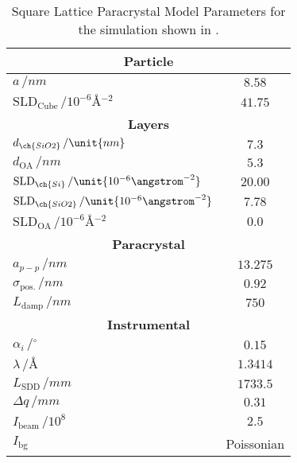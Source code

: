 \documentclass[\main/dresen_thesis.tex]{subfiles}
\begin{document}
  \begin{table}[ht]
    \centering
    \caption{\label{tab:monolayers:structure:squareArrayParacrystal:BornAgainSimulation}Square Lattice Paracrystal Model Parameters for the simulation shown in .}
    \begin{tabular}{l | c}
      \hline
      \multicolumn{2}{c}{\textbf{Particle}}\\
      \hline
      $a \, / \unit{nm}$ &
        $8.58$ \\
      $\mathrm{SLD}_\mathrm{Cube} \, / \unit{10^{-6} \angstrom^{-2}}$ &
        $41.75$ \\
      \hline
      \multicolumn{2}{c}{\textbf{Layers}}\\
      \hline
      $d_{\ch{SiO2}}\, / \unit{nm}$ &
        $7.3$\\
      $d_{\mathrm{OA}}\, / \unit{nm}$ &
        $5.3$\\
      $\mathrm{SLD}_{\ch{Si}} \, / \unit{10^{-6} \angstrom^{-2}}$ &
        $20.00$\\
      $\mathrm{SLD}_{\ch{SiO2}} \, / \unit{10^{-6} \angstrom^{-2}}$ &
        $7.78$\\
      $\mathrm{SLD}_\mathrm{OA} \, / \unit{10^{-6} \angstrom^{-2}}$ &
        $0.0$ \\
      \hline
      \multicolumn{2}{c}{\textbf{Paracrystal}}\\
      \hline
      $a_{p-p} \, / \unit{nm}$ &
        $13.275$ \\
      $\sigma_\mathrm{pos.}\, / \unit{nm}$ &
        $0.92$ \\
      $L_\mathrm{damp} \, / \unit{nm}$ &
        $750$ \\
      \hline
      \multicolumn{2}{c}{\textbf{Instrumental}}\\
      \hline
      $\alpha_i \, / \unit{^\circ}$ &
        $0.15$ \\
      $\lambda \, / \unit{\angstrom}$ &
        $1.3414$ \\
      $L_\mathrm{SDD} \, / \unit{mm}$ &
        $1733.5$ \\
      $\Delta q \, /\unit{mm}$ &
        $0.31$ \\
      $I_\mathrm{beam} \, / \unit{10^8}$ &
        $2.5$ \\
      $I_\mathrm{bg}$ &
        Poissonian \\
      \hline
    \end{tabular}
  \end{table}
\end{document}
